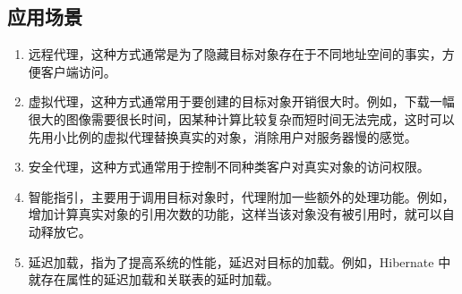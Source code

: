 \subsection{应用场景}
\begin{enumerate}
	\item 远程代理，这种方式通常是为了隐藏目标对象存在于不同地址空间的事实，方便客户端访问。
	\item 虚拟代理，这种方式通常用于要创建的目标对象开销很大时。例如，下载一幅很大的图像需要很长时间，因某种计算比较复杂而短时间无法完成，这时可以先用小比例的虚拟代理替换真实的对象，消除用户对服务器慢的感觉。
	\item 安全代理，这种方式通常用于控制不同种类客户对真实对象的访问权限。
	\item 智能指引，主要用于调用目标对象时，代理附加一些额外的处理功能。例如，增加计算真实对象的引用次数的功能，这样当该对象没有被引用时，就可以自动释放它。
	\item 延迟加载，指为了提高系统的性能，延迟对目标的加载。例如，Hibernate 中就存在属性的延迟加载和关联表的延时加载。
\end{enumerate}
